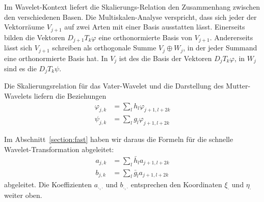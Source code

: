 Im Wavelet-Kontext liefert die Skalierungs-Relation den Zusammenhang
zwischen den verschiedenen Basen.
Die Multiskalen-Analyse verspricht, dass sich jeder der Vektorräume
$V_{j+1}$ auf zwei Arten mit einer Basis ausstatten lässt.
Einerseits bilden die Vektoren $D_{j+1}T_k\varphi$ eine orthonormierte
Basis von $V_{j+1}$.
Andererseits lässt sich $V_{j+1}$ schreiben als orthogonale Summe
$V_j\oplus W_j$, in der jeder Summand eine orthonormierte Basis hat.
In $V_j$ ist des die Basis der Vektoren $D_jT_k\varphi$, in $W_j$
sind es die $D_jT_k\psi$.

Die Skalierungsrelation für das Vater-Wavelet und die Darstellung des
Mutter-Wavelets liefern die Beziehungen
\begin{align*}
\varphi_{j,k} &= \sum_{l} h_{l}\varphi_{j+1,l+2k}
\\
\psi_{j,k} &= \sum_{l} g_{l} \varphi_{j+1,l+2k}
\end{align*}

Im Abschnitt~\ref{section:fast} haben wir daraus die Formeln für
die schnelle Wavelet-Transformation abgeleitet:
\begin{align*}
a_{j,k} &= \sum_{l} \bar{h}_l a_{j+1,l+2k}
\\
b_{j,k} &= \sum_{l} \bar{g}_l a_{j+1,l+2k}
\end{align*}
abgeleitet.
Die Koeffizienten $a_{\cdot,\cdot}$ und $b_{\cdot,\cdot}$ entsprechen
den Koordinaten $\xi_{\cdot}$ und $\eta_{\cdot}$ weiter oben.

